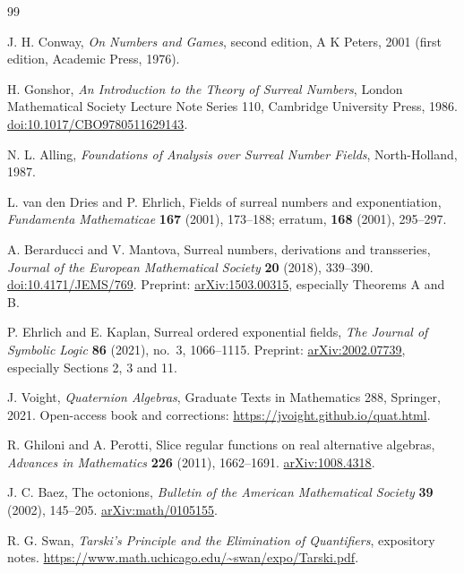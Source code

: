 \documentclass[11pt,letterpaper]{article}
\numberwithin{equation}{section}
\theoremstyle{definition}
\theoremstyle{remark}
\begin{document}
\begingroup
\small
\raggedright
\begin{thebibliography}{99}
\setlength{\itemsep}{0.35em}

J. H. Conway, \emph{On Numbers and Games}, second edition, A K Peters, 2001
(first edition, Academic Press, 1976).

H. Gonshor, \emph{An Introduction to the Theory of Surreal Numbers}, London Mathematical
Society Lecture Note Series 110, Cambridge University Press, 1986.
\href{https://doi.org/10.1017/CBO9780511629143}{doi:10.1017/CBO9780511629143}.

N. L. Alling, \emph{Foundations of Analysis over Surreal Number Fields}, North-Holland,
1987.

L. van den Dries and P. Ehrlich, Fields of surreal numbers and exponentiation,
\emph{Fundamenta Mathematicae} \textbf{167} (2001), 173--188;
erratum, \textbf{168} (2001), 295--297.

A. Berarducci and V. Mantova, Surreal numbers, derivations and transseries,
\emph{Journal of the European Mathematical Society} \textbf{20} (2018), 339--390.
\href{https://doi.org/10.4171/JEMS/769}{doi:10.4171/JEMS/769}.
Preprint: \href{https://arxiv.org/abs/1503.00315}{arXiv:1503.00315}, especially
Theorems A and B.

P. Ehrlich and E. Kaplan, Surreal ordered exponential fields,
\emph{The Journal of Symbolic Logic} \textbf{86} (2021), no.~3, 1066--1115.
Preprint: \href{https://arxiv.org/abs/2002.07739}{arXiv:2002.07739}, especially
Sections 2, 3 and 11.

J. Voight, \emph{Quaternion Algebras}, Graduate Texts in Mathematics 288, Springer, 2021.
Open-access book and corrections: \url{https://jvoight.github.io/quat.html}.

R. Ghiloni and A. Perotti, Slice regular functions on real alternative algebras,
\emph{Advances in Mathematics} \textbf{226} (2011), 1662--1691.
\href{https://arxiv.org/abs/1008.4318}{arXiv:1008.4318}.

J. C. Baez, The octonions, \emph{Bulletin of the American Mathematical Society}
\textbf{39} (2002), 145--205.
\href{https://arxiv.org/abs/math/0105155}{arXiv:math/0105155}.

R. G. Swan, \emph{Tarski's Principle and the Elimination of Quantifiers}, expository
notes. \url{https://www.math.uchicago.edu/~swan/expo/Tarski.pdf}.


\end{thebibliography}
\end{document}
